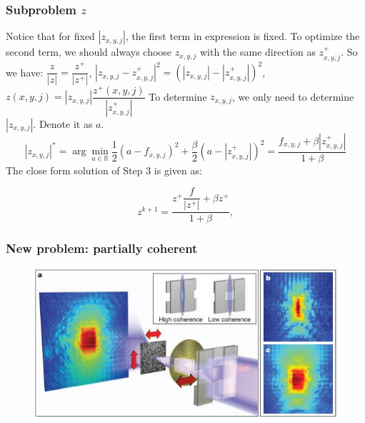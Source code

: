 \documentclass[UTF8]{beamer}
\begin{document}
\begin{frame}[c]\frametitle{Subproblem $z$ }
 Notice that for fixed $|z_{x,y,j}|$, the first term in expression is fixed. To optimize the second term, we should always choose $z_{x,y,j}$ with the same direction as $z_{x,y,j}^+$. So we have: $\dfrac{z}{|z|} = \dfrac{z^+}{|z^+|}$, $|z_{x,y,j} - z_{x,y,j}^+|^2 = (|z_{x,y,j}| - |z_{x,y,j}^+|)^2$,
 $
   z(x,y,j) = |z_{x,y,j}|\dfrac{z^+(x,y,j)}{|z_{x,y,j}^+|}
 $
 To determine $z_{x,y,j}$, we only need to determine $|z_{x,y,j}|$. Denote it as $a$.
 $$
 |z_{x,y,j}|^* = \arg \min_{a \in \mathbb{R}} \frac{1}{2}(a - f_{x,y,j})^2 + \dfrac{\beta}{2}
 (a - |z_{x,y,j}^+|)^2
 = \dfrac{f_{x,y,j} + \beta |z_{x,y,j}^+|}{1 + \beta}
 $$
 The  close form solution of Step 3 is given as:
 
 \begin{equation}
 z^{k+1} = \dfrac{z^+ \dfrac{f}{ |z^+|} + \beta z^+}{1+\beta},
 \label{zup}
 \end{equation}
\end{frame}

\begin{frame}[c]\frametitle{New problem: partially coherent}

\begin{figure}
\includegraphics[width=1\linewidth]{../figures0/partially.jpg}  
  \end{figure}




\end{frame}
\end{document}
